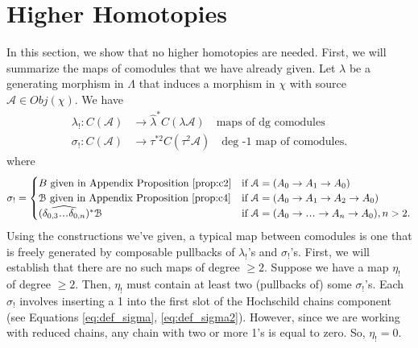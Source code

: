 \section{Higher Homotopies}
In this section, we show 
that no higher homotopies are needed. 
First, we will summarize the 
maps of comodules that we have 
already given. Let $\lambda$ be a 
generating morphism in $\Lambda$ 
that induces a morphism in $\chi$ with 
source $\mathcal{A}\in Obj(\chi)$. We have 
\begin{align*}
\lambda_!: C(\mathcal{A})
&\to 
\hat{\lambda}^*C(\lambda\mathcal{A})
  \quad \textrm{maps of dg comodules}\\
\sigma_!:
  C(\mathcal{A}) 
&\to 
\tau^{*2}C(\tau^2\mathcal{A})
  \quad \textrm{deg -1 map of comodules.}
\end{align*}
where
\begin{align*}
\sigma_!
=
\begin{cases}
B \textrm{ given in Appendix Proposition 
  \ref{prop:c2}}
  & \textrm{if } 
  \mathcal{A} = (A_0 \to A_1 \to A_0)\\
\mathcal{B} \textrm{ given in Appendix 
  Proposition \ref{prop:c4}}
  &  \textrm{if } 
  \mathcal{A} = (A_0 \to A_1 \to A_2 \to A_0)\\
(\widehat{\delta_{0,3}\smdots\delta_{0,n}})^*
  \mathcal{B}
  & \textrm{if } 
  \mathcal{A} = (A_0 \to \smdots \to A_n \to A_0), 
  n>2.
\end{cases}
\end{align*}
Using the constructions we've given, 
a typical map between comodules is 
one that is freely generated by composable 
pullbacks of $\lambda_!$'s and $\sigma_!$'s. 
First, we will establish that there are 
no such maps of degree $\geq2$. Suppose 
we have a map $\eta_!$ of degree 
$\geq2$. Then, $\eta_!$ must contain at 
least two (pullbacks of) some $\sigma_!$'s. 
Each $\sigma_!$ involves inserting a 1 
into the first slot of the Hochschild 
chains component (see Equations 
\ref{eq:def_sigma}, \ref{eq:def_sigma2}). 
However, since we are working with 
reduced chains, any chain with two or 
more 1's is equal to zero. So, 
$\eta_! = 0$.

